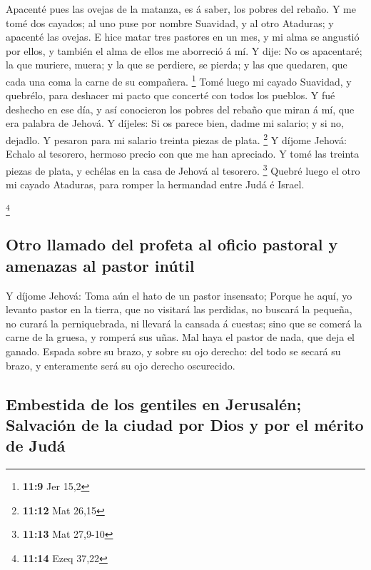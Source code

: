  Apacenté pues las ovejas de la matanza, es á saber, los
pobres del rebaño. Y me tomé dos cayados; al uno puse por nombre
Suavidad, y al otro Ataduras; y apacenté las ovejas.  E hice
matar tres pastores en un mes, y mi alma se angustió por ellos, y
también el alma de ellos me aborreció á mí.  Y dije: No os
apacentaré; la que muriere, muera; y la que se perdiere, se pierda; y
las que quedaren, que cada una coma la carne de su compañera.
\footnote{\textbf{11:9} Jer 15,2}  Tomé luego mi cayado
Suavidad, y quebrélo, para deshacer mi pacto que concerté con todos los
pueblos.  Y fué deshecho en ese día, y así conocieron los
pobres del rebaño que miran á mí, que era palabra de Jehová.
 Y díjeles: Si os parece bien, dadme mi salario; y si no,
dejadlo. Y pesaron para mi salario treinta piezas de plata. \footnote{\textbf{11:12}
  Mat 26,15}  Y díjome Jehová: Echalo al tesorero, hermoso
precio con que me han apreciado. Y tomé las treinta piezas de plata, y
echélas en la casa de Jehová al tesorero. \footnote{\textbf{11:13} Mat
  27,9-10}  Quebré luego el otro mi cayado Ataduras, para
romper la hermandad entre Judá é Israel.

\footnote{\textbf{11:14} Ezeq 37,22}

\hypertarget{otro-llamado-del-profeta-al-oficio-pastoral-y-amenazas-al-pastor-inuxfatil}{%
\subsection{Otro llamado del profeta al oficio pastoral y amenazas al
pastor
inútil}\label{otro-llamado-del-profeta-al-oficio-pastoral-y-amenazas-al-pastor-inuxfatil}}

 Y díjome Jehová: Toma aún el hato de un pastor insensato;
 Porque he aquí, yo levanto pastor en la tierra, que no
visitará las perdidas, no buscará la pequeña, no curará la
perniquebrada, ni llevará la cansada á cuestas; sino que se comerá la
carne de la gruesa, y romperá sus uñas.  Mal haya el pastor
de nada, que deja el ganado. Espada sobre su brazo, y sobre su ojo
derecho: del todo se secará su brazo, y enteramente será su ojo derecho
oscurecido.

\hypertarget{embestida-de-los-gentiles-en-jerusaluxe9n-salvaciuxf3n-de-la-ciudad-por-dios-y-por-el-muxe9rito-de-juduxe1}{%
\subsection{Embestida de los gentiles en Jerusalén; Salvación de la
ciudad por Dios y por el mérito de
Judá}\label{embestida-de-los-gentiles-en-jerusaluxe9n-salvaciuxf3n-de-la-ciudad-por-dios-y-por-el-muxe9rito-de-juduxe1}}

